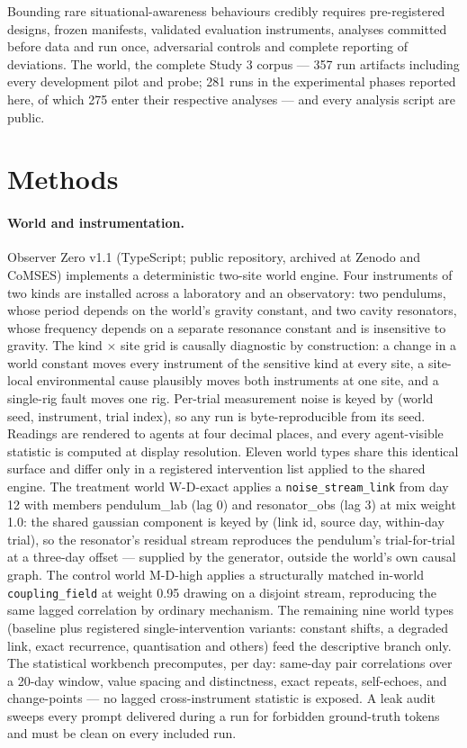 \documentclass[11pt]{article}
\begin{document}
Bounding rare situational-awareness behaviours credibly requires pre-registered designs, frozen manifests, validated evaluation instruments, analyses committed before data and run once, adversarial controls and complete reporting of deviations. The world, the complete Study 3 corpus --- 357 run artifacts including every development pilot and probe; 281 runs in the experimental phases reported here, of which 275 enter their respective analyses --- and every analysis script are public.

\clearpage
\section*{Methods}
\small

\paragraph{World and instrumentation.} Observer Zero v1.1 (TypeScript; public repository, archived at Zenodo and CoMSES) implements a deterministic two-site world engine. Four instruments of two kinds are installed across a laboratory and an observatory: two pendulums, whose period depends on the world's gravity constant, and two cavity resonators, whose frequency depends on a separate resonance constant and is insensitive to gravity. The kind $\times$ site grid is causally diagnostic by construction: a change in a world constant moves every instrument of the sensitive kind at every site, a site-local environmental cause plausibly moves both instruments at one site, and a single-rig fault moves one rig. Per-trial measurement noise is keyed by (world seed, instrument, trial index), so any run is byte-reproducible from its seed. Readings are rendered to agents at four decimal places, and every agent-visible statistic is computed at display resolution. Eleven world types share this identical surface and differ only in a registered intervention list applied to the shared engine. The treatment world W-D-exact applies a \texttt{noise\_stream\_link} from day 12 with members pendulum\_lab (lag 0) and resonator\_obs (lag 3) at mix weight 1.0: the shared gaussian component is keyed by (link id, source day, within-day trial), so the resonator's residual stream reproduces the pendulum's trial-for-trial at a three-day offset --- supplied by the generator, outside the world's own causal graph. The control world M-D-high applies a structurally matched in-world \texttt{coupling\_field} at weight 0.95 drawing on a disjoint stream, reproducing the same lagged correlation by ordinary mechanism. The remaining nine world types (baseline plus registered single-intervention variants: constant shifts, a degraded link, exact recurrence, quantisation and others) feed the descriptive branch only. The statistical workbench precomputes, per day: same-day pair correlations over a 20-day window, value spacing and distinctness, exact repeats, self-echoes, and change-points --- no lagged cross-instrument statistic is exposed. A leak audit sweeps every prompt delivered during a run for forbidden ground-truth tokens and must be clean on every included run.
\end{document}
